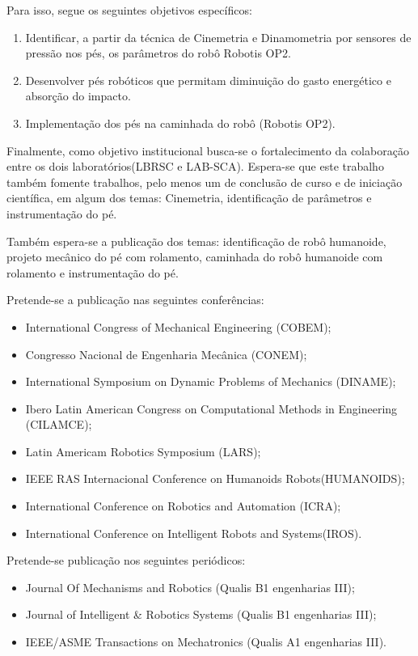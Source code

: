 Para isso, segue os  seguintes objetivos específicos:
\begin{enumerate}
\item 	Identificar, a partir da técnica de Cinemetria e Dinamometria por sensores de pressão nos pés, os parâmetros do robô Robotis OP2.

\item	Desenvolver pés robóticos que permitam diminuição do gasto energético e absorção do impacto.

\item	Implementação dos pés  na caminhada do robô (Robotis OP2).
 \end{enumerate}
Finalmente, como objetivo institucional busca-se o fortalecimento da colaboração entre os dois laboratórios(LBRSC e LAB-SCA). Espera-se que este trabalho também fomente trabalhos, pelo menos um de conclusão de curso e de iniciação científica, em algum dos temas: Cinemetria, identificação de parâmetros e instrumentação do pé. 

Também espera-se a publicação dos temas: identificação de robô humanoide, projeto mecânico do pé com rolamento, caminhada do robô humanoide com rolamento e instrumentação do pé. 

Pretende-se a publicação nas seguintes conferências:
\begin{itemize}
   \item International Congress of Mechanical Engineering (COBEM);
   \item Congresso Nacional de Engenharia Mecânica (CONEM);

\item International Symposium on Dynamic Problems of Mechanics (DINAME);

\item Ibero Latin American Congress on Computational Methods in Engineering (CILAMCE);

\item Latin Americam Robotics Symposium (LARS);

\item IEEE RAS Internacional Conference on Humanoids Robots(HUMANOIDS);

\item International Conference on Robotics and Automation (ICRA);

\item International Conference on Intelligent Robots and Systems(IROS).
 \end{itemize}

Pretende-se publicação nos seguintes periódicos:
\begin{itemize}
\item Journal Of Mechanisms and Robotics (Qualis B1 engenharias III);

\item Journal of Intelligent \& Robotics Systems (Qualis B1 engenharias III);

\item IEEE/ASME Transactions on Mechatronics (Qualis A1 engenharias III).
 \end{itemize}

